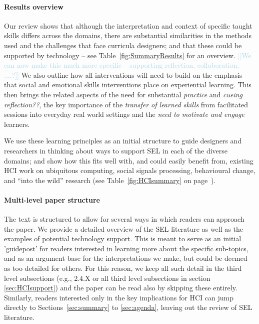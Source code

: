 \documentclass[prodmode,acmtochi]{acmsmall}
\newcommand{\todo}[1]{\textrm{\textrm{\textcolor{LightBlue}{[[#1]]} } } }
\begin{document}
\paragraph{Results overview}
Our review shows that although the interpretation and context of specific taught skills  differs across the domains, there are substantial similarities in the methods used and the challenges that face curricula designers; and that these could be supported by technology -- see Table~\ref{fig:SummaryResults} for an overview.  \todo{We can now make this much more specific -- supporting reflection, collaboration, ....?}
%
We also outline how all interventions will need to build on the emphasis that social and emotional skills interventions place on experiential learning. This then brings the related aspects of the need for substantial \emph{practice} and \emph{cueing reflection??}, the key importance of the \emph{transfer of learned skills} from facilitated sessions into everyday real world settings and the \emph{need to motivate and engage} learners.

We use these learning principles as an initial structure to guide designers and researchers in thinking about ways to support SEL in each of the diverse domains; and show how this fits well with, and could easily benefit from, existing HCI work on ubiquitous computing, social signals processing, behavioural change, and ``into the wild'' research (see Table~\ref{fig:HCIsummary} on page~\pageref{fig:HCIsummary}). 
%

\paragraph{Multi-level paper structure}
The text is structured to allow for several ways in which readers can approach the paper. We provide a detailed overview of the SEL literature as well as the examples of potential technology support. This is meant to serve as an initial 'guidepost' for readers interested in learning more about the specific sub-topics, and as an argument base for the interpretations we make, but could be deemed as too detailed for others. For this reason, we keep all such detail in the third level subsections (e.g., 2.4.X or all third level subsections in section \ref{sec:HCIsupport}) and the paper can be read also by skipping these entirely. Similarly, readers interested only in the key implications for HCI can jump directly to Sections~\ref{sec:summary} to \ref{sec:agenda}, leaving out the review of SEL literature. 
\end{document}
